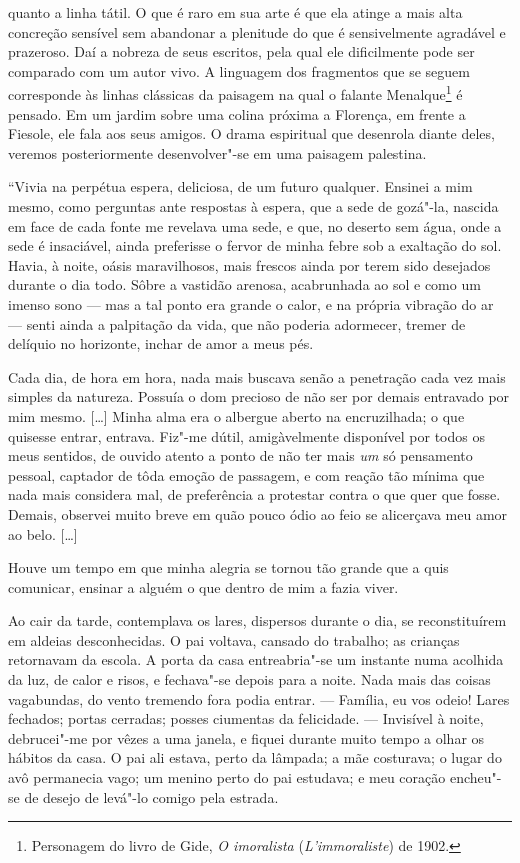 quanto a linha tátil. O que é raro em sua arte é que ela atinge
a mais alta concreção sensível sem abandonar a plenitude do que é
sensivelmente agradável e prazeroso. Daí a nobreza de seus escritos, pela
qual ele dificilmente pode ser comparado com um autor vivo. A
linguagem dos fragmentos que se seguem corresponde às linhas clássicas
da paisagem na qual o falante Menalque\footnote{Personagem do
  livro de Gide, \emph{O imoralista} (\emph{L'immoraliste}) de 1902. \versal{[N. T.]}} é
pensado. Em um jardim sobre uma colina próxima a Florença, em frente a
Fiesole, ele fala aos seus amigos. O drama espiritual que desenrola
diante deles, veremos posteriormente desenvolver"-se em uma paisagem
palestina.

``Vivia na perpétua espera, deliciosa, de um futuro qualquer. Ensinei a
mim mesmo, como perguntas ante respostas à espera, que a sede de
gozá"-la, nascida em face de cada fonte me revelava uma sede, e que, no
deserto sem água, onde a sede é insaciável, ainda preferisse o fervor de
minha febre sob a exaltação do sol. Havia, à noite, oásis maravilhosos,
mais frescos ainda por terem sido desejados durante o dia todo. Sôbre a
vastidão arenosa, acabrunhada ao sol e como um imenso sono --- mas a tal
ponto era grande o calor, e na própria vibração do ar --- senti ainda a
palpitação da vida, que não poderia adormecer, tremer de delíquio no
horizonte, inchar de amor a meus pés.

Cada dia, de hora em hora, nada mais buscava senão a penetração cada vez
mais simples da natureza. Possuía o dom precioso de não ser por demais
entravado por mim mesmo. {[}\ldots{}{]} Minha alma era o albergue aberto na
encruzilhada; o que quisesse entrar, entrava. Fiz"-me dútil,
amigàvelmente disponível por todos os meus sentidos, de ouvido atento a
ponto de não ter mais \emph{um} só pensamento pessoal, captador de tôda
emoção de passagem, e com reação tão mínima que nada mais considera mal,
de preferência a protestar contra o que quer que fosse. Demais, observei
muito breve em quão pouco ódio ao feio se alicerçava meu amor ao belo.
{[}\ldots{}{]}

Houve um tempo em que minha alegria se tornou tão grande que a quis
comunicar, ensinar a alguém o que dentro de mim a fazia viver.

Ao cair da tarde, contemplava os lares, dispersos durante o dia, se
reconstituírem em aldeias desconhecidas. O pai voltava, cansado do
trabalho; as crianças retornavam da escola. A porta da casa
entreabria"-se um instante numa acolhida da luz, de calor e risos, e
fechava"-se depois para a noite. Nada mais das coisas vagabundas, do
vento tremendo fora podia entrar. --- Família, eu vos odeio! Lares
fechados; portas cerradas; posses ciumentas da felicidade. --- Invisível
à noite, debrucei"-me por vêzes a uma janela, e fiquei durante muito
tempo a olhar os hábitos da casa. O pai ali estava, perto da lâmpada; a
mãe costurava; o lugar do avô permanecia vago; um menino perto do pai
estudava; e meu coração encheu"-se de desejo de levá"-lo comigo pela
estrada.

